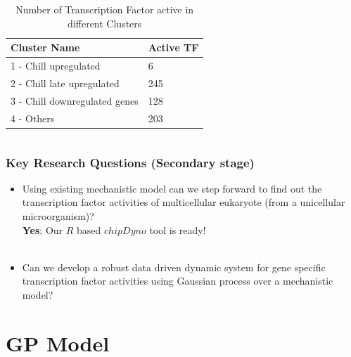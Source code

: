 \documentclass{beamer}
\begin{document}
\begin{frame}
\begin{columns}[c]

\begin{table}
\begin{tabular}{l l }
\toprule
\textbf{{\color{red}Cluster} \color{blue}Name} & \textbf{Active TF} \\
\midrule

{\color{red}1} - {\color{blue}Chill upregulated} & 6 \\ 
{\color{red}2} - {\color{blue}Chill late upregulated} & 245 \\ 
{\color{red}3} - {\color{blue}Chill downregulated genes} & 128 \\
{\color{red}4} - {\color{blue} Others} & 203 \\

\bottomrule
\end{tabular}
\caption{Number of Transcription Factor active in different Clusters}
\end{table}

\end{columns}
\end{frame}



\begin{frame}
\frametitle{Key Research Questions (Secondary stage)}
\begin{itemize} 
\item  Using existing mechanistic model can we step forward to find out the transcription factor activities of multicellular eukaryote (from a unicellular microorganism)? \\
\hfill {\color{green}\textbf{Yes}; Our $R$ based $chipDyno$ tool is ready!} \\~\\
\item {Can we develop a robust data driven dynamic system for gene specific transcription factor activities using Gaussian process over a mechanistic model?} 

\end{itemize}
\end{frame}

\section{GP Model}
\end{document}
